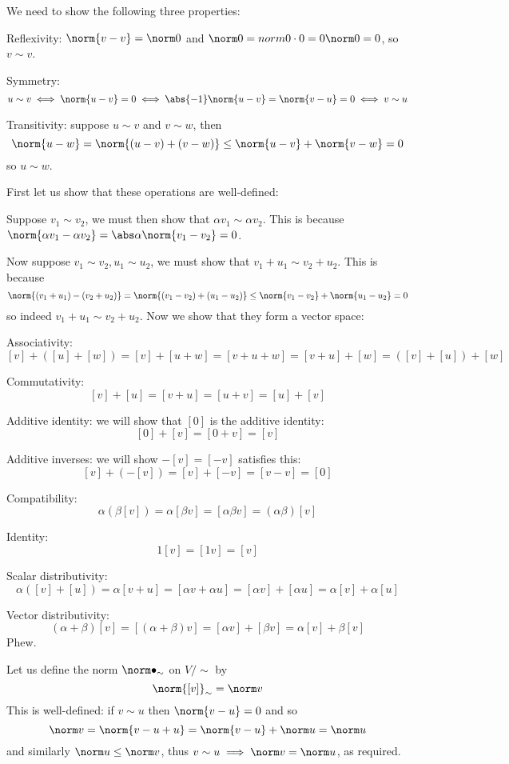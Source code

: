 \eexerc

\benum
    \item We need to show the following three properties:
    \benum
        \item Reflexivity: $\norm{v-v}=\norm0$ and $\norm0=norm{0\cdot0}=0\norm0=0$, so $v\sim v$.
        \item Symmetry:
        $$ u\sim v \iff \norm{u-v} = 0 \iff \abs{-1}\norm{u-v} = \norm{v-u} = 0 \iff v\sim u $$
        \item Transitivity: suppose $u\sim v$ and $v\sim w$, then
        $$ \norm{u-w} = \norm{(u-v)+(v-w)} \leq \norm{u-v} + \norm{v-w} = 0 $$
        so $u\sim w$.
    \eenum
    \item First let us show that these operations are well-defined:
    \benum
        \item Suppose $v_1\sim v_2$, we must then show that $\alpha v_1\sim\alpha v_2$.
        This is because $\norm{\alpha v_1-\alpha v_2}=\abs\alpha\norm{v_1-v_2}=0$.
        \item Now suppose $v_1\sim v_2,u_1\sim u_2$, we must show that $v_1+u_1\sim v_2+u_2$.
        This is because
        $$ \norm{(v_1+u_1)-(v_2+u_2)} = \norm{(v_1-v_2)+(u_1-u_2)} \leq \norm{v_1-v_2} + \norm{u_1-u_2} = 0 $$
        so indeed $v_1+u_1\sim v_2+u_2$.
    \eenum
    Now we show that they form a vector space:
    \benum
        \item Associativity:
        $$ [v] + ([u] + [w]) = [v] + [u+w] = [v+u+w] = [v+u] + [w] = ([v]+[u]) + [w] $$
        \item Commutativity:
        $$ [v] + [u] = [v+u] = [u+v] = [u] + [v] $$
        \item Additive identity: we will show that $[0]$ is the additive identity:
        $$ [0] + [v] = [0+v] = [v] $$
        \item Additive inverses: we will show $-[v]=[-v]$ satisfies this:
        $$ [v] + (-[v]) = [v] + [-v] = [v-v] = [0] $$
        \item Compatibility:
        $$ \alpha(\beta[v]) = \alpha[\beta v] = [\alpha\beta v] = (\alpha\beta)[v] $$
        \item Identity:
        $$ 1[v] = [1v] = [v] $$
        \item Scalar distributivity:
        $$ \alpha([v] + [u]) = \alpha[v+u] = [\alpha v+\alpha u] = [\alpha v] + [\alpha u] = \alpha[v] + \alpha[u] $$
        \item Vector distributivity:
        $$ (\alpha+\beta)[v] = [(\alpha+\beta)v] = [\alpha v] + [\beta v] = \alpha[v] + \beta[v] $$
    \eenum
    Phew.
    \item Let us define the norm $\norm\bullet_\sim$ on $V/{\sim}$ by
    $$ \norm{[v]}_\sim = \norm v $$
    This is well-defined: if $v\sim u$ then $\norm{v-u}=0$ and so
    $$ \norm v = \norm{v-u+u} = \norm{v-u} + \norm u = \norm u $$
    and similarly $\norm u\leq\norm v$, thus $v\sim u\implies\norm v=\norm u$, as required.

